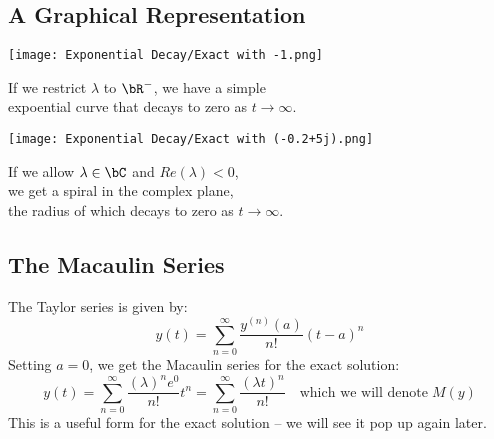 \subsection{A Graphical Representation}
\begin{multicols}{2}
\begin{center}
\texttt{[image: Exponential Decay/Exact with -1.png]}
\end{center}
\par \hspace*{1cm} If we restrict $\lambda$ to $\bR^{-}$, we have a simple\\
\hspace*{1cm} expoential curve that decays to zero as $t \rightarrow \infty$.\\
\columnbreak{}
\begin{center}
\texttt{[image: Exponential Decay/Exact with (-0.2+5j).png]}
\end{center}
\par \hspace*{1cm} If we allow $\lambda \in \bC$ and $Re(\lambda)<0$,\\
\hspace*{1cm} we get a spiral in the complex plane,\\
\hspace*{1cm} the radius of which decays to zero as $t \rightarrow \infty$.\\
\end{multicols}

\subsection{The Macaulin Series}
The Taylor series is given by:
\[y(t) = \sum\limits_{n=0}^{\infty} \frac{{y}^{(n)}(a)}{n!}{(t-a)}^n\]
Setting $a=0$, we get the Macaulin series for the exact solution:
\[y(t) = \sum\limits_{n=0}^{\infty} \frac{{(\lambda)}^n e^0}{n!}t^n = \sum\limits_{n=0}^{\infty} \frac{{(\lambda t)}^n}{n!} \quad\text{which we will denote}\; M(y)\]
This is a useful form for the exact solution -- we will see it pop up again later.

